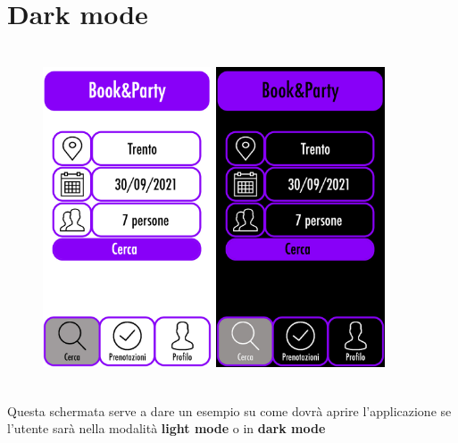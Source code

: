 \section{Dark mode}
\begin{figure}[h]
    \centering
    \includegraphics[width=5cm, height=10cm]{mockup/03-cerca-cliente.jpg}
    \qquad\qquad
    \includegraphics[width=5cm, height=10cm]{mockup/11-dark-mode.jpg}
    \label{fig:mode}
\end{figure}

Questa schermata serve a dare un esempio su come dovrà aprire l'applicazione se l'utente sarà
nella modalità \textbf{light mode} o in \textbf{dark mode}